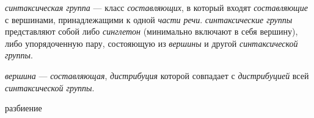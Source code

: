 \textit{синтаксическая группа} --- класс \textit{составляющих}, в который входят \textit{составляющие} с вершинами, принадлежащими к одной \textit{части речи}.
\textit{синтаксические группы} представляют собой либо \textit{синглетон} (минимально включают в себя вершину), либо упорядоченную пару, состояющую из \textit{вершины} и другой \textit{синтаксической группы}.

\textit{вершина} --- \textit{составляющая}, \textit{дистрибуция} которой совпадает с \textit{дистрибуцией} всей \textit{синтаксической группы}.

\begin{SCn}

    \begin{scnrelfromset}{разбиение}
    \end{scnrelfromset}


\end{SCn}

